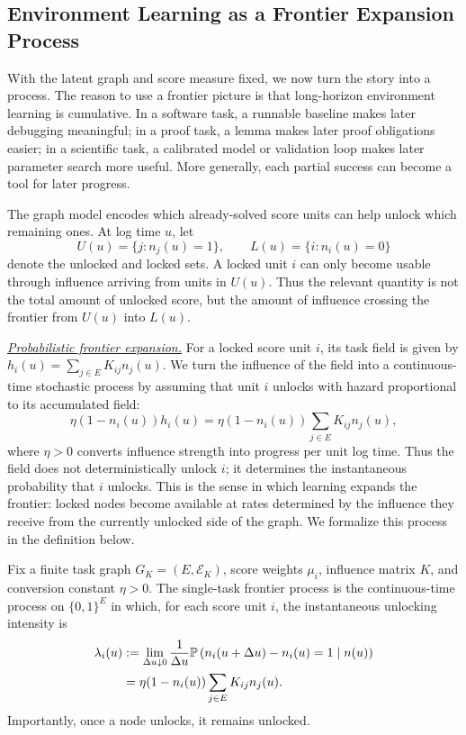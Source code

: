 \subsection{Environment Learning as a Frontier Expansion Process}
\label{subsec:single-task-frontier}

With the latent graph and score measure fixed, we now turn the story into a process. The reason to use a frontier picture is that long-horizon environment learning is cumulative. In a software task, a runnable baseline makes later debugging meaningful; in a proof task, a lemma makes later proof obligations easier; in a scientific task, a calibrated model or validation loop makes later parameter search more useful. More generally, each partial success can become a tool for later progress.

The graph model encodes which already-solved score units can help unlock which
remaining ones. At log time \(u\), let
\[
    U(u)=\{j:n_j(u)=1\},\qquad L(u)=\{i:n_i(u)=0\}
\]
denote the unlocked and locked sets. A locked unit \(i\) can only become usable
through influence arriving from units in \(U(u)\). Thus the relevant quantity is
not the total amount of unlocked score, but the amount of influence crossing the
frontier from \(U(u)\) into \(L(u)\).

\underline{\textit{Probabilistic frontier expansion.}}
For a locked score unit \(i\), its task field is given by \(h_i(u)=\sum_{j\in E}K_{ij}n_j(u)\). We turn the influence of the field into a continuous-time stochastic process
by assuming that unit \(i\) unlocks with hazard proportional to its accumulated field:
\[
    \eta(1-n_i(u))h_i(u)
    =
    \eta(1-n_i(u))\sum_{j\in E}K_{ij}n_j(u),
\]
where \(\eta>0\) converts influence strength into progress per unit log time. Thus the field does not deterministically unlock \(i\); it determines the instantaneous probability that \(i\) unlocks. This is the sense in which learning expands the frontier: locked nodes become available at rates determined by the influence they receive from the currently unlocked side of the graph. We formalize this process in the definition below.

\begin{definition}
\label{def:single-task-frontier-process}
Fix a finite task graph \(G_K=(E,\mathcal E_K)\), score weights \(\mu_i\),
influence matrix \(K\), and conversion constant \(\eta>0\). The single-task
frontier process is the continuous-time process on \(\{0,1\}^E\) in which, for
each score unit \(i\), the instantaneous unlocking intensity is
\begin{align}
    \lambda_i(u) &:= \lim_{\Delta u\downarrow 0}
    \frac{1}{\Delta u}
    \mathbb{P}\left(n_i(u+\Delta u)-n_i(u)=1\mid n(u)\right) \nonumber
    \\
    & =
    \eta(1-n_i(u))\sum_{j\in E}K_{ij}n_j(u) .
    \label{eq:single-task-intensity-new}
\end{align}
Importantly, once a node unlocks, it remains unlocked.
\end{definition}

